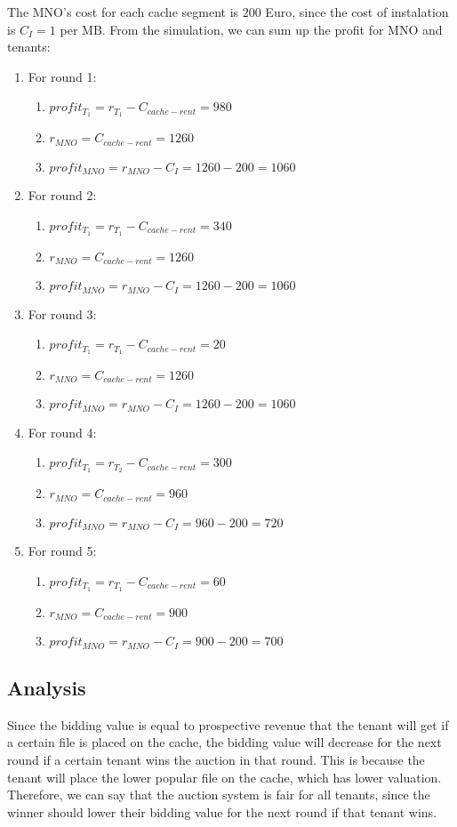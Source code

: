 \documentclass[conference]{IEEEtran}
\begin{document}
The MNO's cost for each cache segment is 200 Euro, since the cost of instalation is $C_I = 1$ per MB. From the simulation, we can sum up the profit for MNO and tenants:
\begin{enumerate}
	\item For round 1:
	\begin{enumerate}
		\item $profit_{T_1} = r_{T_1} - C_{cache-rent} = 980$
		\item $r_{MNO} = C_{cache-rent} = 1260$
		\item $profit_{MNO} = r_{MNO} - C_I = 1260 - 200 = 1060$
	\end{enumerate}
	\item For round 2:
	\begin{enumerate}
		\item $profit_{T_1} = r_{T_1} - C_{cache-rent} = 340$
		\item $r_{MNO} = C_{cache-rent} = 1260$
		\item $profit_{MNO} = r_{MNO} - C_I = 1260 - 200 = 1060$
	\end{enumerate}
	\item For round 3:
	\begin{enumerate}
		\item $profit_{T_1} = r_{T_1} - C_{cache-rent} = 20$
		\item $r_{MNO} = C_{cache-rent} = 1260$
		\item $profit_{MNO} = r_{MNO} - C_I = 1260 - 200 = 1060$
	\end{enumerate}
	\item For round 4:\begin{enumerate}
		\item $profit_{T_1} = r_{T_2} - C_{cache-rent} = 300$
		\item $r_{MNO} = C_{cache-rent} = 960$
		\item $profit_{MNO} = r_{MNO} - C_I = 960 - 200 = 720$
	\end{enumerate}
	\item For round 5:
	\begin{enumerate}
		\item $profit_{T_1} = r_{T_1} - C_{cache-rent} = 60$
		\item $r_{MNO} = C_{cache-rent} = 900$
		\item $profit_{MNO} = r_{MNO} - C_I = 900 - 200 = 700$
	\end{enumerate}
\end{enumerate}

\subsection{Analysis}
Since the bidding value is equal to prospective revenue that the tenant will get if a certain file is placed on the cache, the bidding value will decrease for the next round if a certain tenant wins the auction in that round.
This is because the tenant will place the lower popular file on the cache, which has lower valuation.
Therefore, we can say that the auction system is fair for all tenants, since the winner should lower their bidding value for the next round if that tenant wins.
\end{document}
